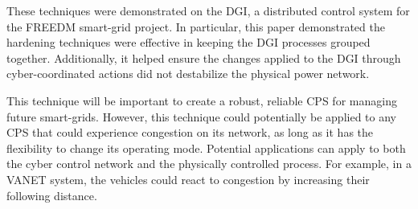 These techniques were demonstrated on the \ac{DGI}, a distributed control system for the \ac{FREEDM} smart-grid project.
In particular, this paper demonstrated the hardening techniques were effective in keeping the \ac{DGI} processes grouped together.
Additionally, it helped ensure the changes applied to the \ac{DGI} through cyber-coordinated actions did not destabilize the physical power network.

This technique will be important to create a robust, reliable \ac{CPS} for managing future smart-grids.
However, this technique could potentially be applied to any \ac{CPS} that could experience congestion on its network, as long as it has the flexibility to change its operating mode.
Potential applications can apply to both the cyber control network and the physically controlled process.
For example, in a \ac{VANET} system, the vehicles could react to congestion by increasing their following distance.
